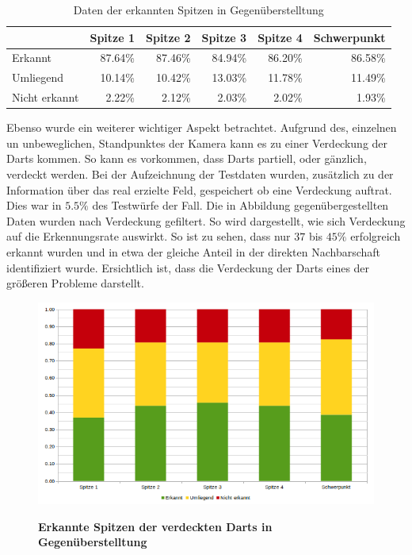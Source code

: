 \begin{table}[htbp]
\caption{Daten der erkannten Spitzen in Gegenüberstelltung}
\begin{tabular}{|l|r|r|r|r|r|}
\hline
 & \multicolumn{1}{l|}{Spitze 1} & \multicolumn{1}{l|}{Spitze 2} & \multicolumn{1}{l|}{Spitze 3} & \multicolumn{1}{l|}{Spitze 4} & \multicolumn{1}{l|}{Schwerpunkt} \\ \hline
Erkannt & 87.64\% & 87.46\% & 84.94\% & 86.20\% & 86.58\% \\ \hline
Umliegend & 10.14\% & 10.42\% & 13.03\% & 11.78\% & 11.49\% \\ \hline
Nicht erkannt & 2.22\% & 2.12\% & 2.03\% & 2.02\% & 1.93\% \\ \hline
\end{tabular}
\label{Tab:plaindata}
\end{table}

Ebenso wurde ein weiterer wichtiger Aspekt betrachtet. Aufgrund des, einzelnen un unbeweglichen, Standpunktes der Kamera kann es zu einer Verdeckung der Darts kommen. So kann es vorkommen, dass Darts partiell, oder gänzlich, verdeckt werden. Bei der Aufzeichnung der Testdaten wurden, zusätzlich zu der Information über das real erzielte Feld, gespeichert ob eine Verdeckung auftrat. Dies war in $5.5\%$ des Testwürfe der Fall.
Die in Abbildung  gegenübergestellten Daten wurden nach Verdeckung gefiltert. So wird dargestellt, wie sich Verdeckung auf die Erkennungsrate auswirkt. So ist zu sehen, dass nur $37$ bis $45\%$ erfolgreich erkannt wurden und in etwa der gleiche Anteil in der direkten Nachbarschaft identifiziert wurde. 
Ersichtlich ist, dass die Verdeckung der Darts eines der größeren Probleme darstellt.

\begin{figure}[ht]
\centering
\includegraphics[width=\textwidth]{media/chartonlycovert}\\
\caption{\textbf{Erkannte Spitzen der verdeckten Darts in Gegenüberstelltung}}
\label{Fig:chartcovert}
\end{figure}

